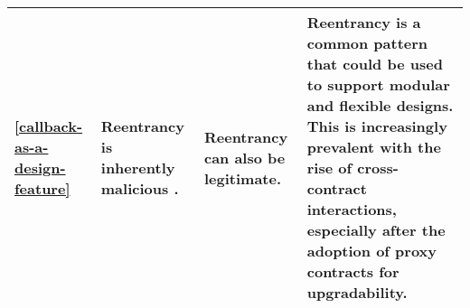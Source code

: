 \begin{table*}[htbp]
\begin{footnotesize}
\begin{tabular}{|p{1.0cm}|p{2.9cm}|p{3.2cm}|p{9.1cm}|}
        \hline
        \ref{callback-as-a-design-feature} & Reentrancy is inherently malicious \cite{reddit-disable-reentrant-behavior}. & Reentrancy can also be legitimate. & Reentrancy is a common pattern that could be used to support modular and flexible designs. This is increasingly prevalent with the rise of cross-contract interactions, especially after the adoption of proxy contracts for upgradability. \\
        \hline
    \end{tabular}
    \end{footnotesize}
    \vspace{-5mm}
    \label{tab:2}
\end{table*}
\egroup
